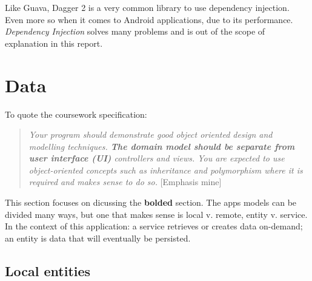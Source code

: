 \documentclass[english,a4paper,]{report}
\begin{document}
Like Guava, Dagger 2 is a very common library to use dependency
injection. Even more so when it comes to Android applications, due to
its performance. \emph{Dependency Injection} solves many problems and is
out of the scope of explanation in this report.

\hypertarget{data}{%
\section{Data}\label{data}}

To quote the coursework specification:

\begin{quote}
\emph{Your program should demonstrate good object oriented design and
modelling techniques. \textbf{The domain model should be separate from
user interface (UI)} controllers and views. You are expected to use
object-oriented concepts such as inheritance and polymorphism where it
is required and makes sense to do so.} {[}Emphasis mine{]}
\end{quote}

This section focuses on dicussing the \textbf{bolded} section. The apps
models can be divided many ways, but one that makes sense is local v.
remote, entity v. service. In the context of this application: a service
retrieves or creates data on-demand; an entity is data that will
eventually be persisted.

\hypertarget{local-entities}{%
\subsection{Local entities}\label{local-entities}}
\end{document}
